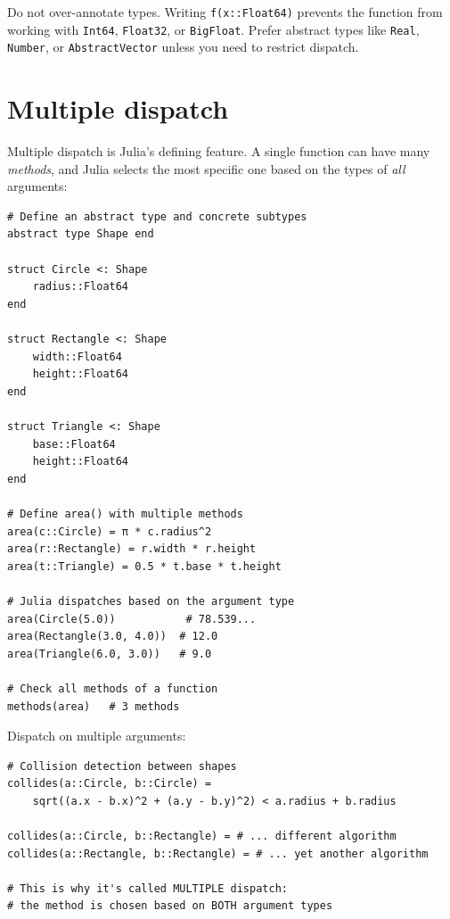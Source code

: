 \begin{warningbox}
Do not over-annotate types. Writing \texttt{f(x::Float64)} prevents the function from working with \texttt{Int64}, \texttt{Float32}, or \texttt{BigFloat}. Prefer abstract types like \texttt{Real}, \texttt{Number}, or \texttt{AbstractVector} unless you need to restrict dispatch.
\end{warningbox}

\section{Multiple dispatch}

Multiple dispatch is Julia's defining feature. A single function can have many \emph{methods}, and Julia selects the most specific one based on the types of \emph{all} arguments:

\begin{verbatim}
# Define an abstract type and concrete subtypes
abstract type Shape end

struct Circle <: Shape
    radius::Float64
end

struct Rectangle <: Shape
    width::Float64
    height::Float64
end

struct Triangle <: Shape
    base::Float64
    height::Float64
end

# Define area() with multiple methods
area(c::Circle) = π * c.radius^2
area(r::Rectangle) = r.width * r.height
area(t::Triangle) = 0.5 * t.base * t.height

# Julia dispatches based on the argument type
area(Circle(5.0))           # 78.539...
area(Rectangle(3.0, 4.0))  # 12.0
area(Triangle(6.0, 3.0))   # 9.0

# Check all methods of a function
methods(area)   # 3 methods
\end{verbatim}

Dispatch on multiple arguments:
\begin{verbatim}
# Collision detection between shapes
collides(a::Circle, b::Circle) =
    sqrt((a.x - b.x)^2 + (a.y - b.y)^2) < a.radius + b.radius

collides(a::Circle, b::Rectangle) = # ... different algorithm
collides(a::Rectangle, b::Rectangle) = # ... yet another algorithm

# This is why it's called MULTIPLE dispatch:
# the method is chosen based on BOTH argument types
\end{verbatim}

